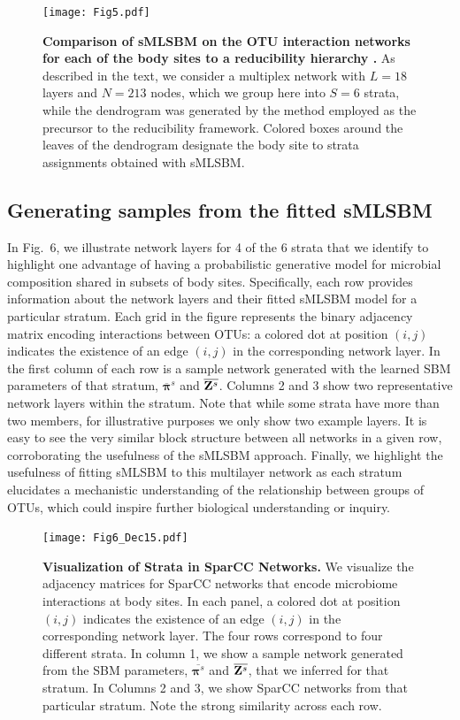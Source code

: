 \begin{figure}[t]
\begin{center}
\texttt{[image: Fig5.pdf]}
\caption{{\bf Comparison of sMLSBM on the OTU interaction networks \cite{sparcc} for each of the body sites to a reducibility hierarchy \cite{domen}.} As described in the text, we consider a multiplex network with $L=18$ layers and $N=213$ nodes, which we group here into $S=6$ strata, while the dendrogram was generated by the method employed as the precursor to the reducibility framework. Colored boxes around the leaves of the dendrogram designate the body site to strata assignments obtained with sMLSBM.}
\end{center}
\end{figure}

\subsection{Generating samples from the fitted sMLSBM}

\indent In Fig.~6, we illustrate network layers for 4 of the 6 strata that we identify to highlight one advantage of having a probabilistic generative model for microbial composition shared in subsets of body sites. Specifically, each row provides information about the network layers and their fitted sMLSBM model for a particular stratum. Each grid in the figure represents the binary adjacency matrix encoding interactions between OTUs: a colored dot at position $(i,j)$ indicates the existence of an edge $(i,j)$ in the corresponding network layer.
In the first column of each row is a sample network generated with the learned SBM parameters of that stratum, $\overline{{\boldsymbol \pi}}^{s}$ and $\overline{{\bf Z}^{s}}$. Columns 2 and 3 show two representative network layers within the stratum. Note that while some strata have more than two members, for illustrative purposes we only show two example layers. 
It is easy to see the very similar block structure between all networks in a given row, corroborating the usefulness of the sMLSBM approach. Finally, we highlight the usefulness of fitting sMLSBM to this multilayer network as each stratum
 elucidates a mechanistic understanding of the relationship between groups of OTUs, which could inspire further biological understanding or inquiry. 

\begin{figure}
\begin{center}
\texttt{[image: Fig6\_Dec15.pdf]}
\caption{{\bf Visualization of Strata in SparCC Networks.} We visualize the adjacency matrices for SparCC networks that encode microbiome interactions at body sites. In each panel, a colored dot at position $(i,j)$ indicates the existence of an edge $(i,j)$ in the corresponding network layer. The four rows correspond to four different strata. In column 1, we show a sample network generated from the SBM parameters, $\overline{{\boldsymbol \pi}^{s}}$ and $\overline{{\bf Z}^{s}}$, that we inferred for that stratum. In Columns 2 and 3, we show SparCC networks from that particular stratum. Note the strong similarity across each row.}
\end{center}
\end{figure}

